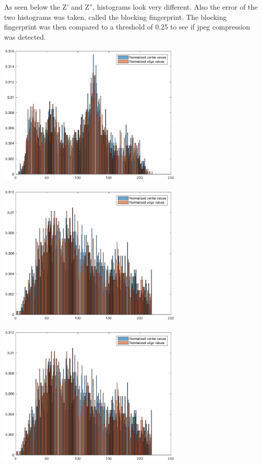 \documentclass{article}
\begin{document}
As seen below the Z' and Z'', histograms look very different. Also
the error of the two histograms was taken, called the blocking fingerprint.
The blocking fingerprint was then compared to a threshold of
0.25 to see if jpeg compression was detected.
    
\includegraphics [width=3.5in]{lab4_01.eps}

\includegraphics [width=3.5in]{lab4_02.eps}

\includegraphics [width=3.5in]{lab4_03.eps}
\end{document}

